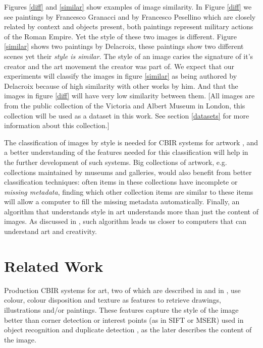 \documentclass[a4paper,twocolumn]{article}
\begin{document}
Figures \ref{diff} and \ref{similar} show examples of image similarity.  In
Figure \ref{diff} we see paintings by Francesco Granacci and by Francesco
Pesellino which are closely related by context and objects present, both
paintings represent military actions of the Roman Empire.  Yet the style of
these two images is different.  Figure \ref{similar} shows two paintings by
Delacroix, these paintings show two different scenes yet their \emph{style is
similar}.  The style of an image caries the signature of it's creator and the
art movement the creator was part of.  We expect that our experiments will
classify the images in figure \ref{similar} as being authored by Delacroix
because of high similarity with other works by him.  And that the images in
figure \ref{diff} will have very low similarity between them.  [All images are
from the public collection of the Victoria and Albert Museum in London, this
collection will be used as a dataset in this work.  See section \ref{datasets}
for more information about this collection.]

The classification of images by style is needed for CBIR systems for artwork
\cite{cfsp12air,isv12mpeg}, and a better understanding of the features needed
for this classification will help in the further development of such systems.
Big collections of artwork, e.g. collections maintained by museums and
galleries, would also benefit from better classification techniques:  often
items in these collections have incomplete or \emph{missing metadata}, finding
which other collection items are similar to these items will allow a computer
to fill the missing metadata automatically.  Finally, an algorithm that
understands style in art understands more than just the content of images.  As
discussed in \cite{rmc12ajs}, such algorithm leads us closer to computers that
can understand art and creativity.

\section{Related Work}

Production CBIR systems for art, two of which are described in \cite{cfsp12air}
and in \cite{ymvz03tree}, use colour, colour disposition and texture as
features to retrieve drawings, illustrations and/or paintings.  These features
capture the style of the image better than corner detection or interest points
(as in SIFT or MSER) used in object recognition and duplicate detection
\cite{szel11book}, as the later describes the content of the image.
\end{document}
